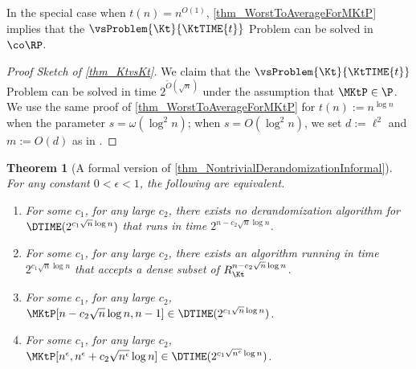 \documentclass[11pt]{article}
\numberwithin{equation}{section}
\newtheorem{theorem}{Theorem}[section]
\theoremstyle{definition}
\theoremstyle{plain}
\begin{document}
In the special case when $t(n) = n^{O(1)}$, \cref{thm_WorstToAverageForMKtP} implies that the $\vsProblem{\Kt}{\KtTIME{t}}$ Problem can be solved
in $\co\RP$.
\begin{proof}
  [Proof Sketch of \cref{thm_KtvsKt}]
  We claim that the $\vsProblem{\Kt}{\KtTIME{t}}$ Problem can be solved in
  time $2^{\widetilde{O}(\sqrt{n})}$
  under the assumption that $\MKtP \in \P$.
  We use the same proof of \cref{thm_WorstToAverageForMKtP} for $t(n) := n^{\log n}$ when the parameter $s = \omega(\log^2 n)$;
  when $s = O(\log^2 n)$, we set $d := \ell^2$ and $m := O(d)$ as in \cite{Hirahara18_focs_conf}.
\end{proof}


\begin{theorem}
  [A formal version of \cref{thm_NontrivialDerandomizationInformal}]
  \label{thm_NontrivialDerandomizationFormal}
  For any constant $0 < \epsilon < 1$, the following are equivalent.
  \begin{enumerate}
    \item
          \label{item_NontrivialDerandomizationInTheorem}
          For some $c_1$, for any large $c_2$,
          there exists no derandomization algorithm for $\DTIME(2^{c_1 \sqrt{n} \log n})$ that runs in time $2^{n - c_2 \sqrt{n} \log n}$.
    \item
          \label{item_MKtPDenseSubset}
          For some $c_1$, for any large $c_2$,
          there exists an algorithm running in time $2^{c_1 \sqrt{n} \log n}$ that accepts a dense subset of $R_{\Kt}^{n - c_2 \sqrt{n} \log n}$.
    \item
          \label{item_MKtPLowerBoundInTheorem}
          For some $c_1$, for any large $c_2$,
          $\MKtP[n - c_2 \sqrt{n} \log n, n-1] \in \DTIME(2^{c_1 \sqrt{n} \log n})$.
    \item
          \label{item_MKtPLowerBoundSmallInTheorem}
          For some $c_1$, for any large $c_2$,
          $\MKtP[n^\epsilon, n^\epsilon + c_2 \sqrt{n^\epsilon} \log n] \in \DTIME(2^{c_1 \sqrt{n^\epsilon} \log n})$.
  \end{enumerate}
\end{theorem}
\end{document}

